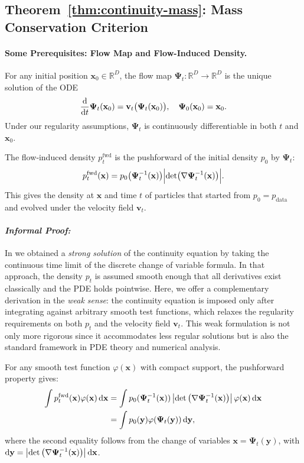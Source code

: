 \subsection{Theorem~\ref{thm:continuity-mass}: Mass Conservation Criterion}\label{app-sec:mass-conservation}

\paragraph{Some Prerequisites: Flow Map and Flow-Induced Density.} For any initial position $\mathbf{x}_0\in\mathbb{R}^D$, the flow map 
$\bm{\Psi}_t:\mathbb{R}^D\to\mathbb{R}^D$ is the unique solution of the ODE
\[
\frac{\mathop{}\!\mathrm{d}}{\mathop{}\!\mathrm{d} t} \bm{\Psi}_t(\mathbf{x}_0)
= \mathbf{v}_t\bigl(\bm{\Psi}_t(\mathbf{x}_0)\bigr), 
\quad \bm{\Psi}_0(\mathbf{x}_0)=\mathbf{x}_0.
\]
Under our regularity assumptions, $\bm{\Psi}_t$ is continuously differentiable in both $t$ and $\mathbf{x}_0$.

The flow‑induced density $p_t^{\mathrm{fwd}}$ is the pushforward of the initial density $p_0$ by $\bm{\Psi}_t$:
\[
p_t^{\mathrm{fwd}}(\mathbf{x})
= p_0\bigl(\bm{\Psi}_t^{-1}(\mathbf{x})\bigr)
  \Bigl|\det \bigl(\nabla\bm{\Psi}_t^{-1}(\mathbf{x})\bigr)\Bigr|.
\]
This gives the density at $\mathbf{x}$ and time $t$ of particles that started from $p_0=p_{\mathrm{data}}$ and evolved under the velocity field $\mathbf{v}_t$.


\paragraph{\textit{Informal Proof:}} 
In  we obtained a \emph{strong solution} of the continuity equation by taking the continuous time limit of the discrete change of variable formula. In that approach, the density $p_t$ is assumed smooth enough that all derivatives exist classically and the PDE holds pointwise. Here, we offer a complementary derivation in the \emph{weak sense}: the continuity equation is imposed only after integrating against arbitrary smooth test functions, which relaxes the regularity requirements on both $p_t$ and the velocity field $\mathbf{v}_t$. This weak formulation is not only more rigorous since it accommodates less regular solutions but is also the standard framework in PDE theory and numerical analysis.


For any smooth test function $ \varphi(\mathbf{x}) $ with compact support, the pushforward property gives:
\begin{align*}
    \int p_t^{\mathrm{fwd}}(\mathbf{x}) \varphi(\mathbf{x})  \mathop{}\!\mathrm{d}\mathbf{x} &= \int p_0(\bm{\Psi}_t^{-1}(\mathbf{x})) \left| \det\left( \nabla \bm{\Psi}_t^{-1}(\mathbf{x}) \right) \right| \varphi(\mathbf{x}) \mathop{}\!\mathrm{d}\mathbf{x}\\ &=  \int p_0(\mathbf{y}) \varphi(\bm{\Psi}_t(\mathbf{y})) \mathop{}\!\mathrm{d}\mathbf{y},
\end{align*}
where the second equality follows from the change of variables $ \mathbf{x} = \bm{\Psi}_t(\mathbf{y}) $, with $ \mathop{}\!\mathrm{d}\mathbf{y} = \left| \det\left( \nabla \bm{\Psi}_t^{-1}(\mathbf{x}) \right) \right| \mathop{}\!\mathrm{d}\mathbf{x} $.


